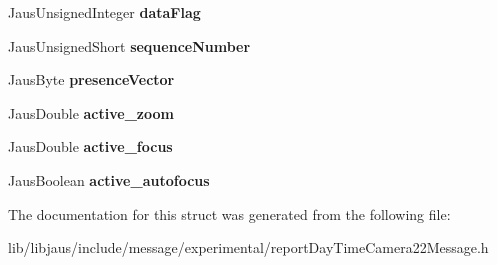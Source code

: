 \begin{DoxyCompactItemize}
\item 
\hypertarget{struct_report_day_time_camera22_message_struct_a4abde48bacb1e0546aeebcc242a8bd11}{\-Jaus\-Unsigned\-Integer {\bfseries data\-Flag}}\label{struct_report_day_time_camera22_message_struct_a4abde48bacb1e0546aeebcc242a8bd11}

\item 
\hypertarget{struct_report_day_time_camera22_message_struct_a16b1edce6d427aefcb2ab3925d98b51f}{\-Jaus\-Unsigned\-Short {\bfseries sequence\-Number}}\label{struct_report_day_time_camera22_message_struct_a16b1edce6d427aefcb2ab3925d98b51f}

\item 
\hypertarget{struct_report_day_time_camera22_message_struct_a1ce989d6dd8d8f8419c1fa9354fc8eb7}{\-Jaus\-Byte {\bfseries presence\-Vector}}\label{struct_report_day_time_camera22_message_struct_a1ce989d6dd8d8f8419c1fa9354fc8eb7}

\item 
\hypertarget{struct_report_day_time_camera22_message_struct_a0068eb1f1dfd9926f3c934725f2fc463}{\-Jaus\-Double {\bfseries active\-\_\-zoom}}\label{struct_report_day_time_camera22_message_struct_a0068eb1f1dfd9926f3c934725f2fc463}

\item 
\hypertarget{struct_report_day_time_camera22_message_struct_a58e1318d651d9dff6eb17286923b1009}{\-Jaus\-Double {\bfseries active\-\_\-focus}}\label{struct_report_day_time_camera22_message_struct_a58e1318d651d9dff6eb17286923b1009}

\item 
\hypertarget{struct_report_day_time_camera22_message_struct_a9317b51005cac8615e411f5828d9ab5f}{\-Jaus\-Boolean {\bfseries active\-\_\-autofocus}}\label{struct_report_day_time_camera22_message_struct_a9317b51005cac8615e411f5828d9ab5f}

\end{DoxyCompactItemize}


\-The documentation for this struct was generated from the following file\-:\begin{DoxyCompactItemize}
\item 
lib/libjaus/include/message/experimental/report\-Day\-Time\-Camera22\-Message.\-h\end{DoxyCompactItemize}
